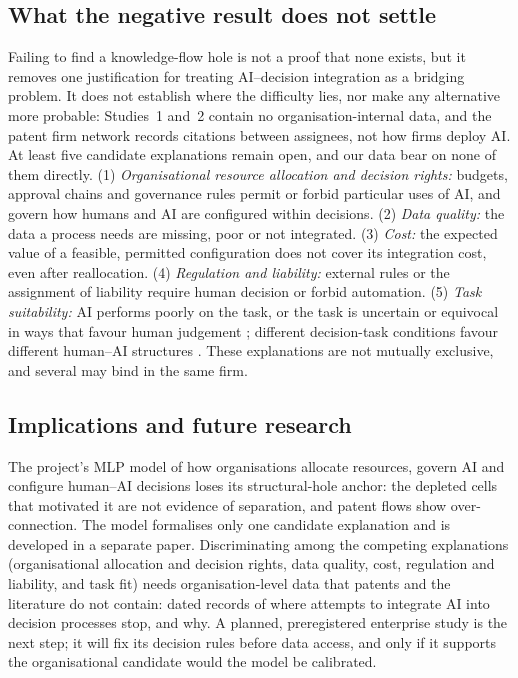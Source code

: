 \subsection{What the negative result does not settle}
\label{sec:discussion_hypothesis}

Failing to find a knowledge-flow hole is not a proof that none exists, but it removes one justification for treating AI--decision integration as a bridging problem. It does not establish where the difficulty lies, nor make any alternative more probable: Studies~1 and~2 contain no organisation-internal data, and the patent firm network records citations between assignees, not how firms deploy AI. At least five candidate explanations remain open, and our data bear on none of them directly. (1) \emph{Organisational resource allocation and decision rights:} budgets, approval chains and governance rules permit or forbid particular uses of AI, and govern how humans and AI are configured within decisions. (2) \emph{Data quality:} the data a process needs are missing, poor or not integrated. (3) \emph{Cost:} the expected value of a feasible, permitted configuration does not cover its integration cost, even after reallocation. (4) \emph{Regulation and liability:} external rules or the assignment of liability require human decision or forbid automation. (5) \emph{Task suitability:} AI performs poorly on the task, or the task is uncertain or equivocal in ways that favour human judgement \citep{jarrahi2018artificial}; different decision-task conditions favour different human--AI structures \citep{shrestha2019organizational}. These explanations are not mutually exclusive, and several may bind in the same firm.

\subsection{Implications and future research}
\label{sec:discussion_implications}

The project's MLP model of how organisations allocate resources, govern AI and configure human--AI decisions loses its structural-hole anchor: the depleted cells that motivated it are not evidence of separation, and patent flows show over-connection. The model formalises only one candidate explanation and is developed in a separate paper. Discriminating among the competing explanations (organisational allocation and decision rights, data quality, cost, regulation and liability, and task fit) needs organisation-level data that patents and the literature do not contain: dated records of where attempts to integrate AI into decision processes stop, and why. A planned, preregistered enterprise study is the next step; it will fix its decision rules before data access, and only if it supports the organisational candidate would the model be calibrated.

